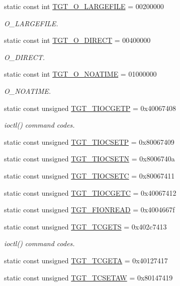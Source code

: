 \begin{Indent}{\bf }
\begin{DoxyCompactItemize}
static const int \hyperlink{classPowerLinux_a9600e092a6309f94d92129ce5f85b945}{TGT\_\-O\_\-LARGEFILE} = 00200000
\begin{DoxyCompactList}\small\item\em O\_\-LARGEFILE. \item\end{DoxyCompactList}\item 
static const int \hyperlink{classPowerLinux_ae5d685a6a2ee8c6fe0ede370f0bec588}{TGT\_\-O\_\-DIRECT} = 00400000
\begin{DoxyCompactList}\small\item\em O\_\-DIRECT. \item\end{DoxyCompactList}\item 
static const int \hyperlink{classPowerLinux_a0ee8b0c23c2babc48e978e872b03c82c}{TGT\_\-O\_\-NOATIME} = 01000000
\begin{DoxyCompactList}\small\item\em O\_\-NOATIME. \item\end{DoxyCompactList}\item 
static const unsigned \hyperlink{classPowerLinux_a90fcc56bd4aa74a5d86c87bfeae77625}{TGT\_\-TIOCGETP} = 0x40067408
\begin{DoxyCompactList}\small\item\em ioctl() command codes. \item\end{DoxyCompactList}\item 
static const unsigned \hyperlink{classPowerLinux_a194059e48b091a80833c40b500e70bec}{TGT\_\-TIOCSETP} = 0x80067409
\item 
static const unsigned \hyperlink{classPowerLinux_a6783bea53088dc89157c39a9a7c71988}{TGT\_\-TIOCSETN} = 0x8006740a
\item 
static const unsigned \hyperlink{classPowerLinux_a98595955a801e37d1d5be450c203afe5}{TGT\_\-TIOCSETC} = 0x80067411
\item 
static const unsigned \hyperlink{classPowerLinux_ad4f95fbdb4f52f68481c247267675007}{TGT\_\-TIOCGETC} = 0x40067412
\item 
static const unsigned \hyperlink{classPowerLinux_a1def346ff527c8efccfd52463f3b5dc1}{TGT\_\-FIONREAD} = 0x4004667f
\item 
static const unsigned \hyperlink{classPowerLinux_a50e5d880569ec2cb9a2f3d4aaa55cc64}{TGT\_\-TCGETS} = 0x402c7413
\begin{DoxyCompactList}\small\item\em ioctl() command codes. \item\end{DoxyCompactList}\item 
static const unsigned \hyperlink{classPowerLinux_a804fc265279c5dbd78e0f95da998b267}{TGT\_\-TCGETA} = 0x40127417
\item 
static const unsigned \hyperlink{classPowerLinux_a96e06e042526ea5e89c4e8a020636c52}{TGT\_\-TCSETAW} = 0x80147419
\end{DoxyCompactItemize}
\end{Indent}


